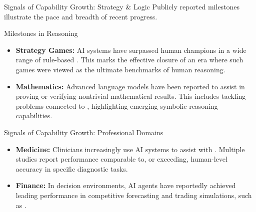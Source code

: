 \documentclass[german,10pt]{beamer}
\begin{document}
\begin{frame}{Signals of Capability Growth: Strategy \& Logic}
    \justifying
    Publicly reported milestones illustrate the pace and breadth of recent progress.
    
    \begin{examplebox}{Milestones in Reasoning}
    \begin{itemize}
        \item \textbf{Strategy Games:} AI systems have surpassed human champions in a wide range of rule-based . This marks the effective closure of an era where such games were viewed as the ultimate benchmarks of human reasoning.
        \item \textbf{Mathematics:} Advanced language models have been reported to assist in proving or verifying nontrivial mathematical results. This includes tackling problems connected to , highlighting emerging symbolic reasoning capabilities.
    \end{itemize}
    \end{examplebox}
\end{frame}

\begin{frame}{Signals of Capability Growth: Professional Domains}
    \justifying
    \begin{itemize}
        \item \textbf{Medicine:} Clinicians increasingly use AI systems to assist with . Multiple studies report performance comparable to, or exceeding, human-level accuracy in specific diagnostic tasks.
        \item \textbf{Finance:} In decision environments, AI agents have reportedly achieved leading performance in competitive forecasting and trading simulations, such as .
    \end{itemize}
\end{frame}
\end{document}

